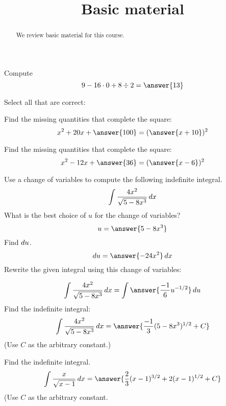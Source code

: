 \documentclass{ximera}
\title[Refresh:]{Basic material}
\begin{document}
\begin{abstract}
  We review basic material for this course. 
\end{abstract}
\maketitle

\begin{problem}
  Compute
  \[
  9-16\cdot 0 + 8\div 2 = \answer{13}
  \]
\end{problem}


\begin{problem}
  Select all that are correct:
  \begin{selectAll}
  \end{selectAll}
\end{problem}


\begin{problem}
  Find the missing quantities that complete the square:
  \[
   x^2 + 20x +\answer{100} = (\answer{x+10})^2 
   \]
\end{problem}


\begin{problem}
  Find the missing quantities that complete the square:
  \[
  x^2-12x + \answer{36} = (\answer{x-6})^2
  \]
\end{problem}


\begin{problem}
  Use a change of variables to compute the following indefinite
  integral.
  \[
  \int \frac{4x^2}{\sqrt{5 - 8x^3}} \mathop{}\!d x
  \]
  What is the best choice of $u$ for the change of variables?
  \[
  u = \answer{5 - 8x^3}
  \]
  Find $\mathop{}\!d u$.
  \[
  \d u = \answer{-24x^2} \d x
  \]
  Rewrite the given integral using this change of variables:
  
  \[
  \int \frac{4x^2}{\sqrt{5 - 8x^3}} \d x = \int \answer{\frac{-1}{6} u^{-1/2}} \d u
  \]
  Find the indefinite integral:
  \[
  \int \frac{4x^2}{\sqrt{5 - 8x^3}} \d x = \answer{\frac{-1}{3}(5-8x^3)^{1/2} + C}
  \]
  (Use $C$ as the arbitrary constant.)
\end{problem}


\begin{problem}
  Find the indefinite integral.
  \[
    \int \frac{x}{\sqrt{x - 1}} \d x = \answer{\frac{2}{3}(x-1)^{3/2} + 2(x - 1)^{1/2} + C}
  \]  
  (Use $C$ as the arbitrary constant.
\end{problem}
\end{document}

